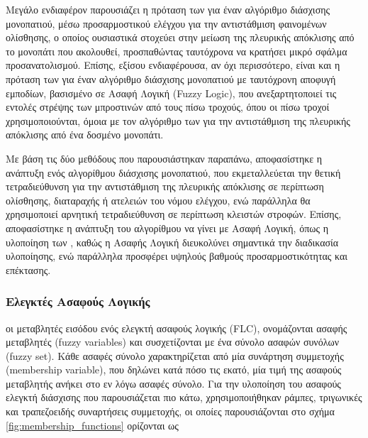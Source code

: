 \bigskip
Μεγάλο ενδιαφέρον παρουσιάζει η πρόταση των \citeauthor{offroad_adaptive_control} \cite{offroad_adaptive_control} για έναν αλγόριθμο διάσχισης μονοπατιού, μέσω προσαρμοστικού ελέγχου για την αντιστάθμιση φαινομένων ολίσθησης, ο οποίος ουσιαστικά στοχεύει στην μείωση της πλευρικής απόκλισης από το μονοπάτι που ακολουθεί, προσπαθώντας ταυτόχρονα να κρατήσει μικρό σφάλμα προσανατολισμού. Επίσης, εξίσου ενδιαφέρουσα, αν όχι περισσότερο, είναι και η πρόταση των \citeauthor{reactive_fuzzy_ptc} \cite{reactive_fuzzy_ptc} για έναν αλγόριθμο διάσχισης μονοπατιού με ταυτόχρονη αποφυγή εμποδίων, βασισμένο σε Ασαφή Λογική (Fuzzy Logic), που ανεξαρτητοποιεί τις εντολές στρέψης των μπροστινών από τους πίσω τροχούς, όπου οι πίσω τροχοί χρησιμοποιούνται, όμοια με τον αλγόριθμο των \citeauthor{offroad_adaptive_control} \cite{offroad_adaptive_control} για την αντιστάθμιση της πλευρικής απόκλισης από ένα δοσμένο μονοπάτι.

\bigskip
Με βάση τις δύο μεθόδους που παρουσιάστηκαν παραπάνω, αποφασίστηκε η ανάπτυξη ενός αλγορίθμου διάσχισης μονοπατιού, που εκμεταλλεύεται την θετική τετραδιεύθυνση για την αντιστάθμιση της πλευρικής απόκλισης σε περίπτωση ολίσθησης, διαταραχής ή ατελειών του νόμου ελέγχου, ενώ παράλληλα θα χρησιμοποιεί αρνητική τετραδιεύθυνση σε περίπτωση κλειστών στροφών. Επίσης, αποφασίστηκε η ανάπτυξη του αλγορίθμου να γίνει με Ασαφή Λογική, όπως η υλοποίηση των \citeauthor{reactive_fuzzy_ptc} \cite{reactive_fuzzy_ptc}, καθώς η Ασαφής Λογική διευκολύνει σημαντικά την διαδικασία υλοποίησης, ενώ παράλληλα προσφέρει υψηλούς βαθμούς προσαρμοστικότητας και επέκτασης.

\subsubsection{Ελεγκτές Ασαφούς Λογικής} \label{sssec:fuzzy_controllers}
οι μεταβλητές εισόδου ενός ελεγκτή ασαφούς λογικής (FLC), ονομάζονται ασαφής μεταβλητές (fuzzy variables) και συσχετίζονται με ένα σύνολο ασαφών συνόλων (fuzzy set). Κάθε ασαφές σύνολο χαρακτηρίζεται από μία συνάρτηση συμμετοχής (membership variable), που δηλώνει κατά πόσο τις εκατό, μία τιμή της ασαφούς μεταβλητής ανήκει στο εν λόγω ασαφές σύνολο. Για την υλοποίηση του ασαφούς ελεγκτή διάσχισης που παρουσιάζεται πιο κάτω, χρησιμοποιήθηκαν ράμπες, τριγωνικές και τραπεζοειδής συναρτήσεις συμμετοχής, οι οποίες παρουσιάζονται στο σχήμα \ref{fig:membership_functions} ορίζονται ως

